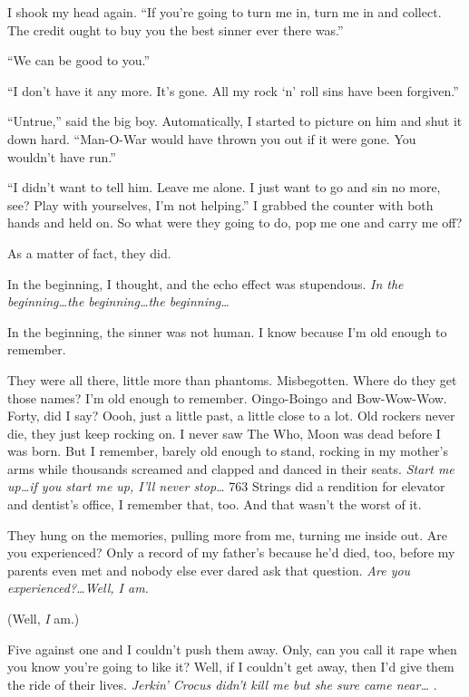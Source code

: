 I shook my head again. ``If you're going to turn me in, turn me in and collect. The credit ought to buy you the best sinner ever there was.''

``We can be good to you.''

``I don't have it any more. It's gone. All my rock `n' roll sins have been forgiven.''

``Untrue,'' said the big boy. Automatically, I started to picture on him and shut it down hard. ``Man-O-War would have thrown you out if it were gone. You wouldn't have run.''

``I didn't want to tell him. Leave me alone. I just want to go and sin no more, see? Play with yourselves, I'm not helping.'' I grabbed the counter with both hands and held on. So what were they going to do, pop me one and carry me off?

As a matter of fact, they did.

In the beginning, I thought, and the echo effect was stupendous. \textit{In the beginning\ldots the beginning\ldots the beginning\ldots}

In the beginning, the sinner was not human. I know because I'm old enough to remember.

They were all there, little more than phantoms. Misbegotten. Where do they get those names? I'm old enough to remember. Oingo-Boingo and Bow-Wow-Wow. Forty, did I say? Oooh, just a little past, a little close to a lot. Old rockers never die, they just keep rocking on. I never saw The Who, Moon was dead before I was born. But I remember, barely old enough to stand, rocking in my mother's arms while thousands screamed and clapped and danced in their seats. \textit{Start me up\ldots if you start me up, I'll never stop\ldots} 763 Strings did a rendition for elevator and dentist's office, I remember that, too. And that wasn't the worst of it.

They hung on the memories, pulling more from me, turning me inside out. Are you experienced? Only a record of my father's because he'd died, too, before my parents even met and nobody else ever dared ask that question. \textit{Are you experienced?\ldots Well, I am.}

(Well, \textit{I} am.)

Five against one and I couldn't push them away. Only, can you call it rape when you know you're going to like it? Well, if I couldn't get away, then I'd give them the ride of their lives. \textit{Jerkin' Crocus didn't kill me but she sure came near\ldots} .

